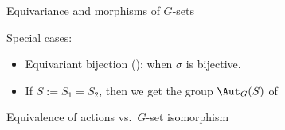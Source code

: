 \documentclass[8pt, handout]{beamer}
\begin{document}
\begin{frame}[fragile]{Equivariance and morphisms of $G$-sets}
  \medskip
  
  Special cases:
  \begin{itemize}
  \item Equivariant bijection (): when
    $\sigma$ is bijective.
  \item If $S:=S_1=S_2$, then we get the group $\Aut_G(S)$ of 
  \end{itemize}   

\end{frame}


\begin{frame}{Equivalence of actions vs.\ $G$-set isomorphism} %


\end{frame}
\end{document}
